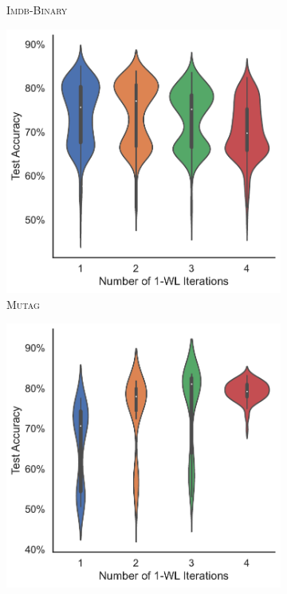 \begin{figure}[!htb]
\begin{subfigure}[b]{0.19\textwidth}
        \caption{\scriptsize\textsc{Imdb-Binary}}
	\end{subfigure}
	\hfill
	\begin{subfigure}[b]{0.19\textwidth}
		\centering
		\includegraphics[width=\textwidth]{Figures/k_wl_violin_MUTAG.pdf}
        \caption{\scriptsize\textsc{Mutag}}
	\end{subfigure}
	\hfill
	\begin{subfigure}[b]{0.19\textwidth}
		\centering
		\includegraphics[width=\textwidth]{Figures/k_wl_violin_NCI1.pdf}

\end{subfigure}
\end{figure}
